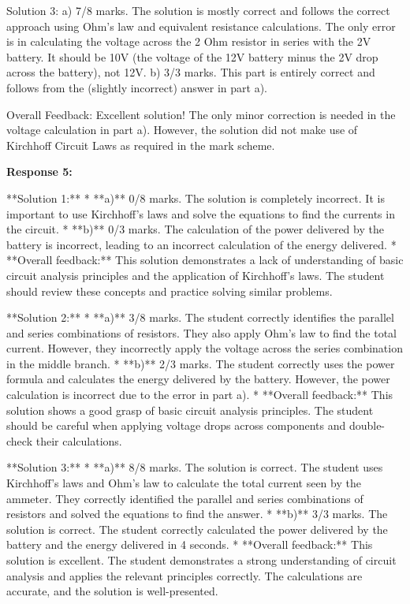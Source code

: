 \documentclass[a4paper,11pt]{article}
\begin{document}
Solution 3:
a) 7/8 marks. The solution is mostly correct and follows the correct approach using Ohm's law and equivalent resistance calculations. The only error is in calculating the voltage across the 2 Ohm resistor in series with the 2V battery. It should be 10V (the voltage of the 12V battery minus the 2V drop across the battery), not 12V.
b) 3/3 marks. This part is entirely correct and follows from the (slightly incorrect) answer in part a).

Overall Feedback: Excellent solution! The only minor correction is needed in the voltage calculation in part a). However, the solution did not make use of Kirchhoff Circuit Laws as required in the mark scheme.



\textbf{Response 5:}

**Solution 1:**
* **a)** 0/8 marks. The solution is completely incorrect. It is important to use Kirchhoff's laws and solve the equations to find the currents in the circuit.
* **b)** 0/3 marks. The calculation of the power delivered by the battery is incorrect, leading to an incorrect calculation of the energy delivered.
* **Overall feedback:** This solution demonstrates a lack of understanding of basic circuit analysis principles and the application of Kirchhoff's laws. The student should review these concepts and practice solving similar problems.

**Solution 2:**
* **a)** 3/8 marks. The student correctly identifies the parallel and series combinations of resistors. They also apply Ohm's law to find the total current. However, they incorrectly apply the voltage across the series combination in the middle branch.
* **b)** 2/3 marks. The student correctly uses the power formula and calculates the energy delivered by the battery. However, the power calculation is incorrect due to the error in part a).
* **Overall feedback:** This solution shows a good grasp of basic circuit analysis principles. The student should be careful when applying voltage drops across components and double-check their calculations.

**Solution 3:**
* **a)** 8/8 marks. The solution is correct. The student uses Kirchhoff's laws and Ohm's law to calculate the total current seen by the ammeter. They correctly identified the parallel and series combinations of resistors and solved the equations to find the answer.
* **b)** 3/3 marks. The solution is correct. The student correctly calculated the power delivered by the battery and the energy delivered in 4 seconds.
* **Overall feedback:** This solution is excellent. The student demonstrates a strong understanding of circuit analysis and applies the relevant principles correctly. The calculations are accurate, and the solution is well-presented.
\end{document}
